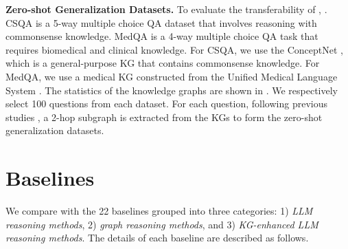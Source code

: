 \noindent\textbf{Zero-shot Generalization Datasets.} To evaluate the transferability of \ourmethod, . CSQA is a 5-way multiple choice QA dataset that involves reasoning with commonsense knowledge. MedQA is a 4-way multiple choice QA task that requires biomedical and clinical knowledge.  For CSQA, we use the ConceptNet \citep{speer2017conceptnet}, which is a general-purpose KG that contains commonsense knowledge. For MedQA, we use a medical KG constructed from the Unified Medical Language System \citep{yasunaga2021qa}. The statistics of the knowledge graphs are shown in . We respectively select 100 questions from each dataset. For each question, following previous studies \citep{feng2020scalable,yasunaga2021qa}, a 2-hop subgraph is extracted from the KGs to form the zero-shot generalization datasets.





\section{Baselines}\label{app:baselines}
We compare \ourmethod with the 22 baselines grouped into three categories: 1) \emph{LLM reasoning methods}, 2) \emph{graph reasoning methods}, and 3) \emph{KG-enhanced LLM reasoning methods}. The details of each baseline are described as follows.

